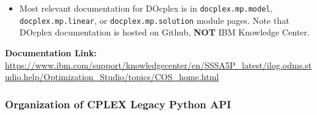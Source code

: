 \documentclass[12pt]{article}
\begin{document}
\begin{itemize}
    \item Most relevant documentation for DOcplex is in \texttt{docplex.mp.model}, \texttt{docplex.mp.linear}, or \texttt{docplex.mp.solution} module pages. Note that DOcplex documentation is hosted on Github, \textbf{NOT} IBM Knowledge Center.
\end{itemize}
\textbf{Documentation Link:} \url{https://www.ibm.com/support/knowledgecenter/en/SSSA5P_latest/ilog.odms.studio.help/Optimization_Studio/topics/COS_home.html}

\subsubsection{Organization of CPLEX Legacy Python API}
\end{document}
